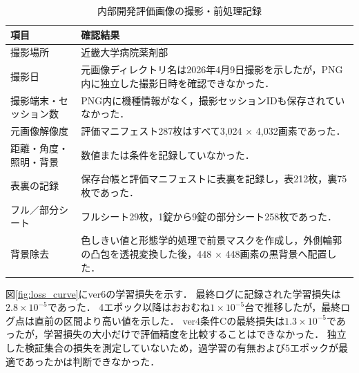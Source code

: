 \documentclass[uplatex,dvipdfmx]{jsarticle}
\begin{document}
\begin{table}[htbp]
  \centering
  \caption{内部開発評価画像の撮影・前処理記録}
  \label{tab:capture_conditions}
  \small
  \begin{tabular}{|p{4.0cm}|p{8.2cm}|}
    \hline
    項目 & 確認結果 \\ \hline
    撮影場所 & 近畿大学病院薬剤部 \\ \hline
    撮影日 & 元画像ディレクトリ名は2026年4月9日撮影を示したが，PNG内に独立した撮影日時を確認できなかった． \\ \hline
    撮影端末・セッション数 & PNG内に機種情報がなく，撮影セッションIDも保存されていなかった． \\ \hline
    元画像解像度 & 評価マニフェスト287枚はすべて3,024 $\times$ 4,032画素であった． \\ \hline
    距離・角度・照明・背景 & 数値または条件を記録していなかった． \\ \hline
    表裏の記録 & 保存台帳と評価マニフェストに表裏を記録し，表212枚，裏75枚であった． \\ \hline
    フル／部分シート & フルシート29枚，1錠から9錠の部分シート258枚であった． \\ \hline
    背景除去 & 色しきい値と形態学的処理で前景マスクを作成し，外側輪郭の凸包を透視変換した後，448 $\times$ 448画素の黒背景へ配置した． \\ \hline
  \end{tabular}
\end{table}

図\ref{fig:loss_curve}にver6の学習損失を示す．
最終ログに記録された学習損失は$2.8 \times 10^{-5}$であった．
4エポック以降はおおむね$1 \times 10^{-5}$台で推移したが，最終ログ点は直前の区間より高い値を示した．
ver4条件Cの最終損失は$1.3 \times 10^{-5}$であったが，学習損失の大小だけで評価精度を比較することはできなかった．
独立した検証集合の損失を測定していないため，過学習の有無および5エポックが最適であったかは判断できなかった．
\end{document}
